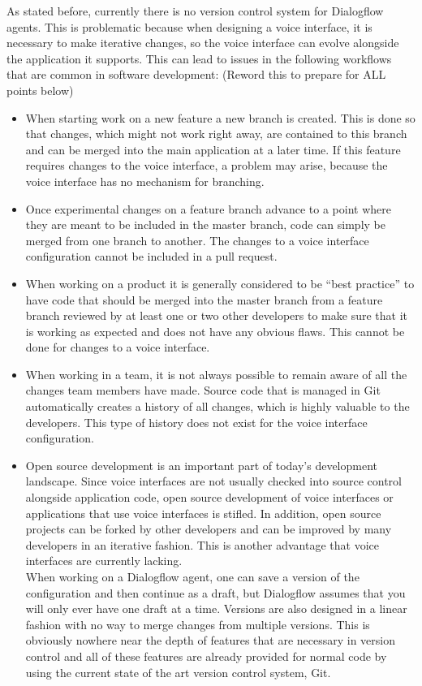 As stated before, currently there is no version control system for Dialogflow agents.
This is problematic because when designing a voice interface, it is necessary to make iterative changes, so the voice interface can evolve alongside the application it supports. This can lead to issues in the following workflows that are common in software development:  (Reword this to prepare for ALL points below)
\begin{itemize}
    \item When starting work on a new feature a new branch is created. This is done so that changes, which might not work right away, are contained to this branch and can be merged into the main application at a later time. If this feature requires changes to the voice interface, a problem may arise, because the voice interface has no mechanism for branching.
    \item Once experimental changes on a feature branch advance to a point where they are meant to be included in the master branch, code can simply be merged from one branch to another. The changes to a voice interface configuration cannot be included in a pull request.
    \item When working on a product it is generally considered to be “best practice” to have code that should be merged into the master branch from a feature branch reviewed by at least one or two other developers to make sure that it is working as expected and does not have any obvious flaws. This cannot be done for changes to a voice interface.
    \item When working in a team, it is not always possible to remain aware of all the changes team members have made. Source code that is managed in Git automatically creates a history of all changes, which is highly valuable to the developers. This type of history does not exist for the voice interface configuration.
    \item Open source development is an important part of today's development landscape. Since voice interfaces are not usually checked into source control alongside application code, open source development of voice interfaces or applications that use voice interfaces is stifled. In addition, open source projects can be forked by other developers and can be improved by many developers in an iterative fashion. This is another advantage that voice interfaces are currently lacking. \\
          When working on a Dialogflow agent, one can save a version of the configuration and then continue as a draft, but Dialogflow assumes that you will only ever have one draft at a time. Versions are also designed in a linear fashion with no way to merge changes from multiple versions. This is obviously nowhere near the depth of features that are necessary in version control and all of these features are already provided for normal code by using the current state of the art version control system, Git.
\end{itemize}


